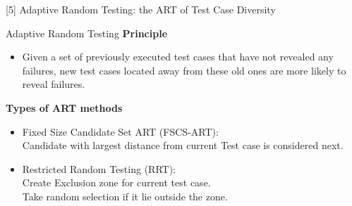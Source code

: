\documentclass[10pt]{beamer}
\begin{document}
\begin{frame}{[5] Adaptive Random Testing: the ART of Test Case Diversity}


%
%
	\begin{block}{Adaptive Random Testing}
		\textbf{Principle}
		\begin{itemize}
			
			\item Given a set of previously executed test cases
			that have not revealed any failures, new test cases
			located away from these old ones are more likely to
			reveal failures.
		\end{itemize}
		\textbf{Types of ART methods}
		\begin{itemize}
			\item Fixed Size Candidate Set ART (FSCS-ART):\\
			Candidate with largest distance from current Test case is considered next.
			\item Restricted Random Testing (RRT):\\
			Create Exclusion zone for current test case.\\
			Take random selection if it lie outside the zone.
		\end{itemize}
		
	\end{block}
\end{frame}

\end{document}
